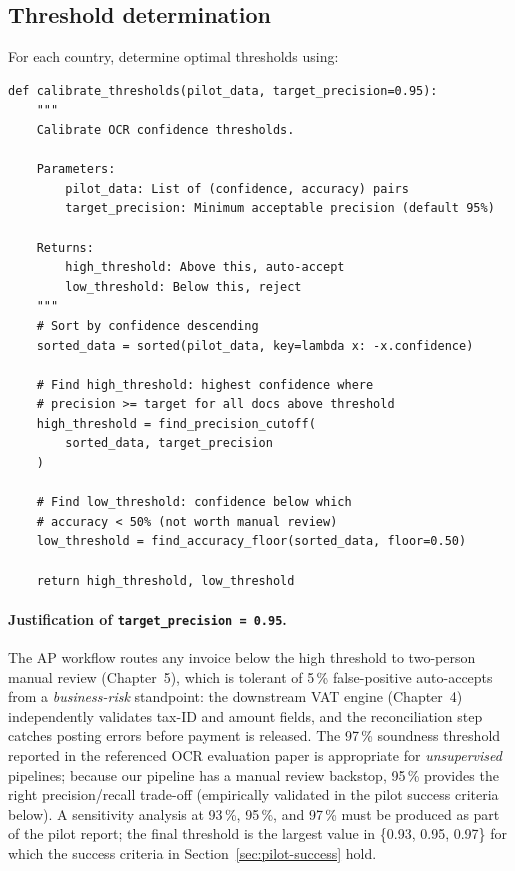 \subsection{Threshold determination}

For each country, determine optimal thresholds using:

\begin{lstlisting}[basicstyle=\ttfamily\small,caption={Threshold calibration algorithm.}]
def calibrate_thresholds(pilot_data, target_precision=0.95):
    """
    Calibrate OCR confidence thresholds.

    Parameters:
        pilot_data: List of (confidence, accuracy) pairs
        target_precision: Minimum acceptable precision (default 95%)

    Returns:
        high_threshold: Above this, auto-accept
        low_threshold: Below this, reject
    """
    # Sort by confidence descending
    sorted_data = sorted(pilot_data, key=lambda x: -x.confidence)

    # Find high_threshold: highest confidence where
    # precision >= target for all docs above threshold
    high_threshold = find_precision_cutoff(
        sorted_data, target_precision
    )

    # Find low_threshold: confidence below which
    # accuracy < 50% (not worth manual review)
    low_threshold = find_accuracy_floor(sorted_data, floor=0.50)

    return high_threshold, low_threshold
\end{lstlisting}

\paragraph{Justification of \texttt{target\_precision = 0.95}.}
The AP workflow routes any invoice below the high threshold to
two-person manual review (Chapter~5), which is tolerant of 5\,\%
false-positive auto-accepts from a \emph{business-risk} standpoint:
the downstream VAT engine (Chapter~4) independently validates
tax-ID and amount fields, and the reconciliation step catches
posting errors before payment is released. The 97\,\% soundness
threshold reported in the referenced OCR evaluation paper is
appropriate for \emph{unsupervised} pipelines; because our pipeline
has a manual review backstop, 95\,\% provides the right
precision/recall trade-off (empirically validated in the pilot
success criteria below). A sensitivity analysis at 93\,\%, 95\,\%,
and 97\,\% must be produced as part of the pilot report; the final
threshold is the largest value in \{0.93, 0.95, 0.97\} for which
the success criteria in Section~\ref{sec:pilot-success} hold.

